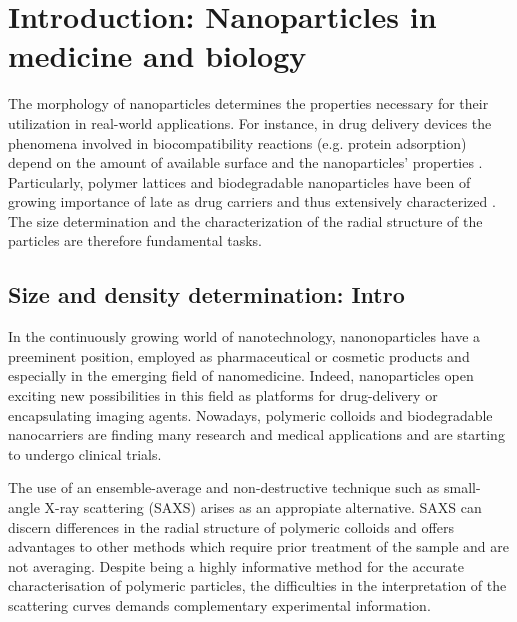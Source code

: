 \chapter{Introduction: Nanoparticles in medicine and biology}
The morphology of nanoparticles determines the properties necessary for their utilization in real-world applications. For instance, in drug delivery devices the phenomena involved in biocompatibility reactions (e.g. protein adsorption) depend on the amount of available surface and the nanoparticles' properties \citet{vittaz_effect_1996}. Particularly, polymer lattices and biodegradable nanoparticles have been of growing importance of late as drug carriers \citet{kattan_phase_1992} and thus extensively characterized \citet{soppimath_biodegradable_2001}. The size determination and the characterization of the radial structure of the particles are therefore fundamental tasks. 

\section{Size and density determination: Intro}
In the continuously growing world of nanotechnology, nanonoparticles have a preeminent position, employed as pharmaceutical or cosmetic products\citep{guterres_polymeric_2007} and especially in the emerging field of nanomedicine. Indeed, nanoparticles open exciting new possibilities in this field as platforms for drug-delivery\citep{wang_nanoparticle_2012} or encapsulating imaging agents\citep{tao_shape-specific_2011}. Nowadays, polymeric colloids and biodegradable nanocarriers are finding many research and medical applications\citep{vicent_polymer_2006} and are starting to undergo clinical trials\citep{patel_polymeric_2012,beija_colloidal_2012,cabral_progress_2014}.

The use of an ensemble-average and non-destructive technique such as small-angle X-ray scattering (SAXS) arises as an appropiate alternative\citep{leonard_jr_size_1952,motzkus_untersuchung_1959}. SAXS can discern differences in the radial structure of polymeric colloids and offers advantages to other methods which require prior treatment of the sample and are not averaging\citep{silverstein_microstructure_1989,joensson_morphology_1991}. Despite being a highly informative method for the accurate characterisation of polymeric particles, the difficulties in the interpretation of the scattering curves demands complementary experimental information\citep{mykhaylyk_structural_2012}.

